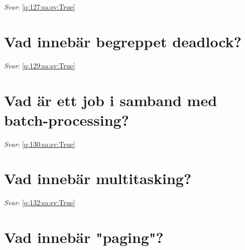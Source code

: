 \documentclass[a4paper,11pt,oneside]{book}
\begin{document}
\begin{sloppypar}
\label{q:127:sa:sv:False}

\vspace{2cm}

\noindent\makebox[\textwidth]{\hrulefill}

\vspace{1cm}

\textit{Svar}: \autoref{q:127:sa:sv:True}



\section{Vad inneb\"ar begreppet deadlock?}

\label{q:129:sa:sv:False}

\vspace{2cm}

\noindent\makebox[\textwidth]{\hrulefill}

\vspace{1cm}

\textit{Svar}: \autoref{q:129:sa:sv:True}



\section{Vad \"ar ett job i samband med batch-processing?}

\label{q:130:sa:sv:False}

\vspace{2cm}

\noindent\makebox[\textwidth]{\hrulefill}

\vspace{1cm}

\textit{Svar}: \autoref{q:130:sa:sv:True}



\section{Vad inneb\"ar multitasking?}

\label{q:132:sa:sv:False}

\vspace{2cm}

\noindent\makebox[\textwidth]{\hrulefill}

\vspace{1cm}

\textit{Svar}: \autoref{q:132:sa:sv:True}



\section{Vad inneb\"ar "paging"?}


\end{sloppypar}
\end{document}
